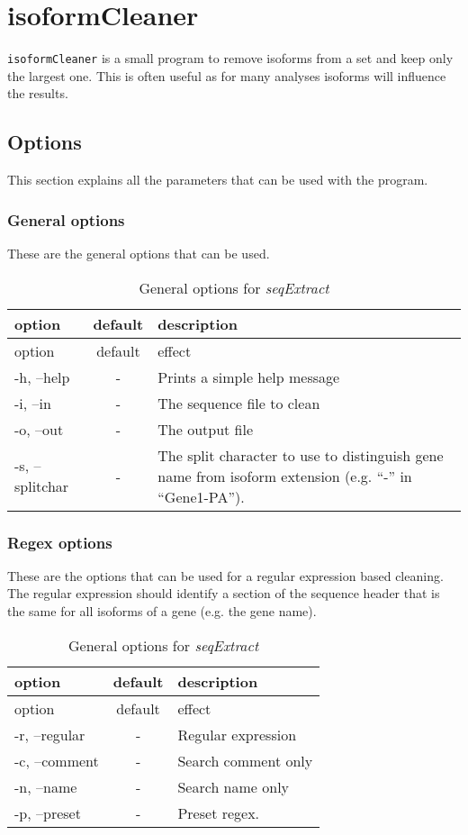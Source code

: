 \chapter{isoformCleaner}

\texttt{isoformCleaner} is a small program to remove isoforms from a set and keep only the largest one. This is often useful as for many analyses isoforms will influence the results.   


\section{Options}


This section explains all the parameters that can be used with the program.
\subsection{General options}

These are the general options that can be used.
\begin{table}[H]
\caption{General options for \textit{seqExtract}}
\begin{tabular}{lcp{10cm}}\hline
option & default & description\\
\hline
option 	&default 	&effect\\
-h, --help &	- 	&Prints a simple help message\\
-i, --in &	- 	&The sequence file to clean\\
-o, --out &	- 	&The output file\\
-s, --splitchar& 	-& 	The split character to use to distinguish gene name from isoform extension (e.g. “-” in “Gene1-PA”).\\
\end{tabular}
\end{table}

\subsection{Regex options}

These are the options that can be used for a regular expression based cleaning. The regular expression should identify a section of the sequence header that is the same for all isoforms of a gene (e.g. the gene name).

\begin{table}[H]
\caption{General options for \textit{seqExtract}}
\begin{tabular}{lcp{10cm}}\hline
option & default & description\\
\hline
option &	default &	effect\\
-r, --regular 	&- 	&Regular expression\\
-c, --comment 	&- 	&Search comment only\\
-n, --name 	&- 	&Search name only\\
-p, --preset &	 -  	&Preset regex.\\\hline
\end{tabular}
\end{table}

